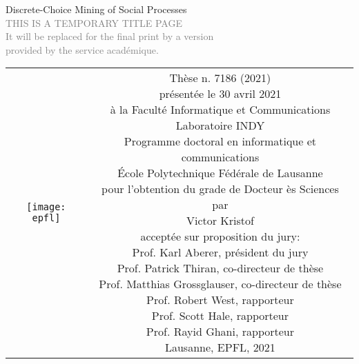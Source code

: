 \begin{titlepage}
	\begin{center}
		\sffamily


		\null\vspace{2cm}
		{\huge Discrete-Choice Mining of Social Processes} \\[24pt]
		\textcolor{gray}{\small{THIS IS A TEMPORARY TITLE PAGE \\ It will be replaced for the final print by a version \\ provided by the service académique.}}

		\vfill

		\begin{tabular} {cc}
			\parbox{0.3\textwidth}{\texttt{[image: epfl]}}
			 &
			\parbox{0.7\textwidth}{%
			Thèse n. 7186 (2021)                                 \\
			présentée le 30 avril 2021                           \\
			à la Faculté Informatique et Communications          \\
			Laboratoire INDY                                     \\
			Programme doctoral en informatique et communications \\
			École Polytechnique Fédérale de Lausanne             \\[6pt]
			pour l'obtention du grade de Docteur ès Sciences     \\
			par                                                  \\[4pt]
			\null \hspace{3em} Victor Kristof                    \\[9pt]
				\small
			acceptée sur proposition du jury:                    \\[4pt]
			Prof. Karl Aberer, président du jury                 \\
			Prof. Patrick Thiran, co-directeur de thèse          \\
			Prof. Matthias Grossglauser, co-directeur de thèse   \\
			Prof. Robert West, rapporteur                        \\
			Prof. Scott Hale, rapporteur                         \\
			Prof. Rayid Ghani, rapporteur                        \\[12pt]
				Lausanne, EPFL, 2021}
		\end{tabular}
	\end{center}
	\vspace{2cm}
\end{titlepage}
